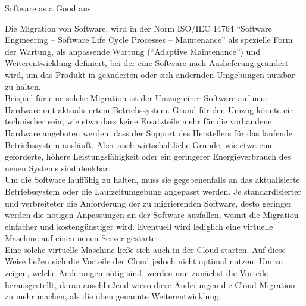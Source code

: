 Software as a Good aus 


Die Migration von Software, wird in der Norm ISO/IEC 14764 "`Software
Engineering -- Software Life Cycle Processes -- Maintenance"' als spezielle
Form der Wartung, als anpassende Wartung ("`Adaptive Maintenance"') und
Weiterentwicklung definiert, bei der eine Software nach Auslieferung geändert
wird, um das Produkt in geänderten oder sich ändernden Umgebungen nutzbar zu
halten.  \\
Beispiel für eine solche Migration ist der Umzug einer Software auf neue
Hardware mit aktualisiertem Betriebssystem. Grund für den Umzug könnte ein
technischer sein, wie etwa dass keine Ersatzteile mehr für die vorhandene
Hardware angeboten werden, dass der Support des Herstellers für das laufende
Betriebssystem ausläuft. Aber auch wirtschaftliche Gründe, wie etwa eine
geforderte, höhere Leistungsfähigkeit oder ein geringerer Energieverbrauch des
neuen Systems sind denkbar. \\
Um die Software lauffähig zu halten, muss sie gegebenenfalls an das
aktualisierte Betriebssystem oder die Laufzeitumgebung angepasst werden.
Je standardisierter und verbreiteter die Anforderung der zu migrierenden
Software, desto geringer werden die nötigen Anpassungen an der
Software ausfallen, womit die Migration einfacher und kostengünstiger wird.
Eventuell wird lediglich eine virtuelle Maschine auf einen neuen Server
gestartet. \\

Eine solche virtuelle Maschine ließe sich auch in der Cloud starten. Auf
diese Weise ließen sich die Vorteile der Cloud jedoch nicht optimal nutzen. Um
zu zeigen, welche Änderungen nötig sind, werden nun zunächst die Vorteile
herausgestellt, daran anschließend wieso diese Änderungen die Cloud-Migration
zu mehr machen, als die oben genannte Weiterentwicklung.

